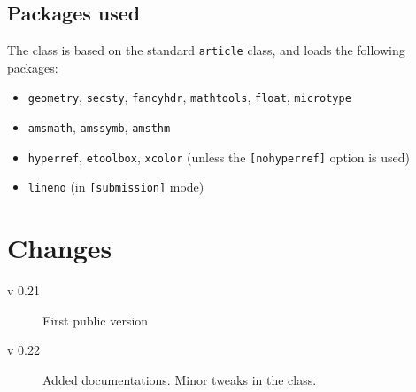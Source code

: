 \documentclass[preprint]{iacrtrans}
\begin{document}
\subsection{Packages used}

The class is based on the standard \texttt{article} class, and loads
the following packages:
\begin{itemize}
\item \texttt{geometry}, \texttt{secsty}, \texttt{fancyhdr}, \texttt{mathtools},
  \texttt{float}, \texttt{microtype}
\item \texttt{amsmath}, \texttt{amssymb}, \texttt{amsthm}
\item \texttt{hyperref}, \texttt{etoolbox}, \texttt{xcolor} (unless
  the \texttt{[nohyperref]} option is used)
\item \texttt{lineno} (in \texttt{[submission]} mode)
\end{itemize}

\section*{Changes}

\begin{description}
\item[v 0.21] First public version
\item[v 0.22] Added documentations.  Minor tweaks in the class.
\end{description}
\end{document}

